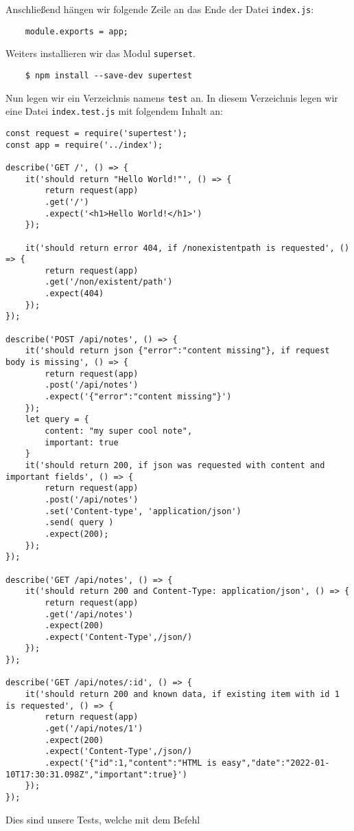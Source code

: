 \noindent
Anschließend hängen wir folgende Zeile an das Ende der Datei \verb|index.js|:

\begin{verbatim}
	module.exports = app;
\end{verbatim}

\noindent
Weiters installieren wir das Modul \verb|superset|.

\begin{verbatim}
	$ npm install --save-dev supertest
\end{verbatim}

\noindent
Nun legen wir ein Verzeichnis namens \verb|test| an.
In diesem Verzeichnis legen wir eine Datei \verb|index.test.js| 
mit folgendem Inhalt an:

\begin{verbatim}
const request = require('supertest');
const app = require('../index');

describe('GET /', () => {
	it('should return "Hello World!"', () => {
		return request(app)
		.get('/')
		.expect('<h1>Hello World!</h1>')
	});
	
	it('should return error 404, if /nonexistentpath is requested', () => {
		return request(app)
		.get('/non/existent/path')
		.expect(404)
	});
});

describe('POST /api/notes', () => {
	it('should return json {"error":"content missing"}, if request body is missing', () => {
		return request(app)
		.post('/api/notes')
		.expect('{"error":"content missing"}')
	});
	let query = {
		content: "my super cool note",
		important: true
	}
	it('should return 200, if json was requested with content and important fields', () => {
		return request(app)
		.post('/api/notes')
		.set('Content-type', 'application/json')
		.send( query )
		.expect(200);
	});
});

describe('GET /api/notes', () => {
	it('should return 200 and Content-Type: application/json', () => {
		return request(app)
		.get('/api/notes')
		.expect(200)
		.expect('Content-Type',/json/)
	});
});

describe('GET /api/notes/:id', () => {
	it('should return 200 and known data, if existing item with id 1 is requested', () => {
		return request(app)
		.get('/api/notes/1')
		.expect(200)
		.expect('Content-Type',/json/)
		.expect('{"id":1,"content":"HTML is easy","date":"2022-01-10T17:30:31.098Z","important":true}')
	});
});
\end{verbatim}

\noindent
Dies sind unsere Tests, welche mit dem Befehl

